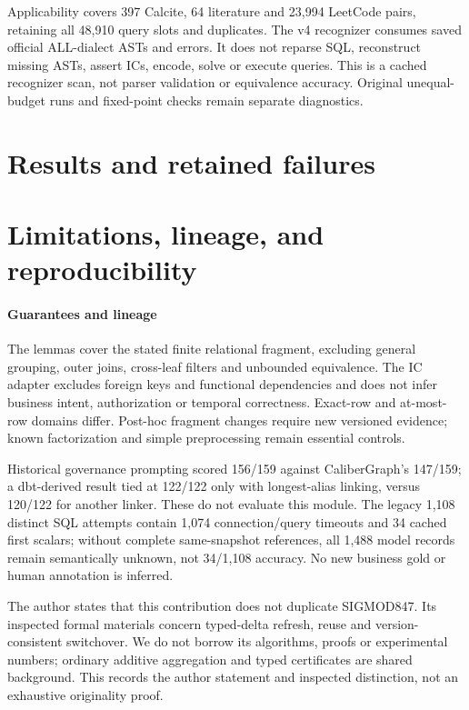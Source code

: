 \documentclass[3p,times,authoryear]{elsarticle}
\begin{document}
Applicability covers 397 Calcite, 64 literature and 23,994 LeetCode pairs, retaining all 48,910 query slots and duplicates. The v4 recognizer consumes saved official ALL-dialect ASTs and errors. It does not reparse SQL, reconstruct missing ASTs, assert ICs, encode, solve or execute queries. This is a cached recognizer scan, not parser validation or equivalence accuracy. Original unequal-budget runs and fixed-point checks remain separate diagnostics.

\section{Results and retained failures}\label{sec:results}


\section{Limitations, lineage, and reproducibility}
\paragraph{Guarantees and lineage}
The lemmas cover the stated finite relational fragment, excluding general grouping, outer joins, cross-leaf filters and unbounded equivalence. The IC adapter excludes foreign keys and functional dependencies and does not infer business intent, authorization or temporal correctness. Exact-row and at-most-row domains differ. Post-hoc fragment changes require new versioned evidence; known factorization and simple preprocessing remain essential controls.

Historical governance prompting scored 156/159 against CaliberGraph's 147/159; a dbt-derived result tied at 122/122 only with longest-alias linking, versus 120/122 for another linker. These do not evaluate this module. The legacy 1,108 distinct SQL attempts contain 1,074 connection/query timeouts and 34 cached first scalars; without complete same-snapshot references, all 1,488 model records remain semantically unknown, not 34/1,108 accuracy. No new business gold or human annotation is inferred.

The author states that this contribution does not duplicate SIGMOD847. Its inspected formal materials concern typed-delta refresh, reuse and version-consistent switchover. We do not borrow its algorithms, proofs or experimental numbers; ordinary additive aggregation and typed certificates are shared background. This records the author statement and inspected distinction, not an exhaustive originality proof.
\end{document}
